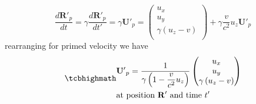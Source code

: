 \begin{equation}%
     \dfrac{d \mathbf{R}'_p}{dt} =\gamma \dfrac{d \mathbf{R}'_p}{dt'} = \gamma\mathbf{U'}_p   = \begin{pmatrix}
    u_x \\ u_y  \\ \gamma \left( u_z  - v  \right) \\
    \end{pmatrix} + \gamma\dfrac{v}{c^2} u_z  \mathbf{U'}_p
\end{equation}%
rearranging for primed velocity we have
\begin{equation}%
\label{vector velocity transform}
\mhl{
\begin{aligned}
     &\mathbf{U'}_p = \dfrac{1}{\gamma\left(1- \dfrac{v}{c^2} u_z\right) }\begin{pmatrix}
    u_x \\ u_y  \\ \gamma \left( u_z  - v  \right) \\
    \end{pmatrix}  \\
    &\text{at position $\mathbf{R'}$ and time $t'$ } 
\end{aligned}      
    }
\end{equation}%

